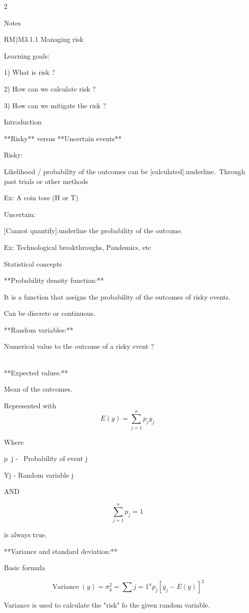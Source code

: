 \documentclass{article}
\begin{document}
\begin{multicols}{2}


    
Notes

RM)M3.1.1 Managing risk

Learning goals:

1)  What is risk ?

2)  How can we calculate risk ?

3)  How can we mitigate the risk ?

Introduction

**Risky** versus **Uncertain events**

Risky:

Likelihood / probability of the outcomes can be [calculated]{.underline}.\
Through past trials or other methods

Ex: A coin toss (H or T)

Uncertain:

[Cannot quantify]{.underline} the probability of the outcome.

Ex: Technological breakthroughs, Pandemics, etc

Statistical concepts

**Probability density function:**

It is a function that assigns the probability of the outcomes of risky events.

Can be discrete or continuous.

**Random variables:**

Numerical value to the outcome of a risky event ?

\\

**Expected values:**

Mean of the outcomes.

Represented with$$
E(y)=\sum_{j=1}^n p_j y_j 
$$

Where

\space p~j -~ Probability of event j

\space Yj - Random variable j

AND

$$
\sum_{j=1}^n p_j = 1$$

is always true.

**Variance and standard deviation:**

Basic formula

$$
\operatorname{Variance}(y)=\sigma_y^2=\sum{j=1}^n p_j\left[y_j-E(y)\right]^2
$$

Variance is used to calculate the "risk" fo the given random variable.


\end{multicols}
\end{document}
